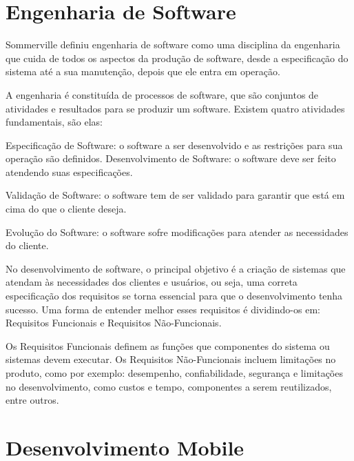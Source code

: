 \section{Engenharia de Software}
\label{sec:engenharia-de-software}

Sommerville  definiu engenharia de software como uma disciplina da engenharia que cuida de todos os aspectos da produção de software, desde a especificação do sistema até a sua manutenção, depois que ele entra em operação.

A engenharia é constituída de processos de software, que são conjuntos de atividades e resultados para se produzir um software. Existem quatro atividades fundamentais, são elas: 
\begin{alineascomponto}

\item Especificação de Software: o software a ser desenvolvido e as restrições para sua operação são definidos. 
Desenvolvimento de Software: o software deve ser feito atendendo suas especificações.
\item Validação de Software: o software tem de ser validado para garantir que está em cima do que o cliente deseja. 
\item Evolução do Software: o software sofre modificações para atender as necessidades do cliente. \cite{somm}
\end{alineascomponto}

No desenvolvimento de software, o principal objetivo é a criação de sistemas que atendam às necessidades dos clientes e usuários, ou seja, uma correta especificação dos requisitos se torna essencial para que o desenvolvimento tenha sucesso. Uma forma de entender melhor esses requisitos é dividindo-os em: Requisitos Funcionais e Requisitos Não-Funcionais. 


Os Requisitos Funcionais definem as funções que componentes do sistema ou sistemas devem executar. 
Os Requisitos Não-Funcionais incluem limitações no produto, como por exemplo: desempenho, confiabilidade, segurança e limitações no desenvolvimento, como custos e tempo, componentes a serem reutilizados, entre outros. \cite{vac}

\section{Desenvolvimento Mobile}
\label{sec:desenvolvimento-mobile}

